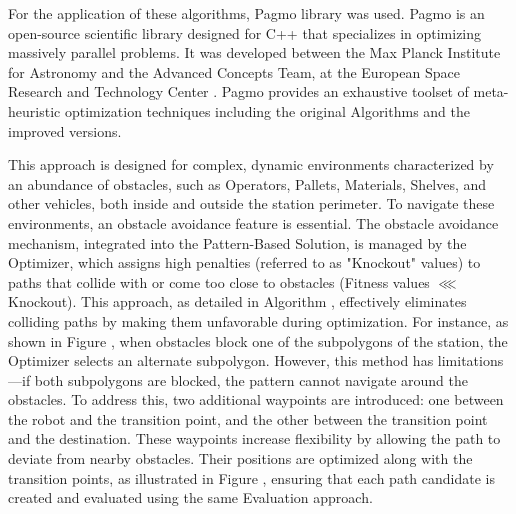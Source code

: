 For the application of these algorithms, Pagmo library was used. Pagmo is an open-source scientific library designed for 
C++ that specializes in optimizing massively parallel problems. It was developed between the Max Planck Institute for 
Astronomy and the Advanced Concepts Team, at the European Space Research and Technology Center \cite{R45}.
Pagmo provides an exhaustive toolset of meta-heuristic optimization techniques including the original Algorithms
and the improved versions. 

This approach is designed for complex, dynamic environments characterized by an abundance of obstacles, such 
as Operators, Pallets, Materials, Shelves, and other vehicles, both inside and outside the station perimeter. 
To navigate these environments, an obstacle avoidance feature is essential. The obstacle avoidance mechanism, 
integrated into the Pattern-Based Solution, is managed by the Optimizer, which assigns high penalties 
(referred to as "Knockout" values) to paths that collide with or come too close to obstacles 
(Fitness values $\lll$ Knockout). This approach, as detailed in Algorithm , 
effectively eliminates colliding paths by making them unfavorable during optimization. For instance, 
as shown in Figure , when obstacles block one of the subpolygons of the station, the 
Optimizer selects an alternate subpolygon. However, this method has limitations—if both subpolygons 
are blocked, the pattern cannot navigate around the obstacles. To address this, two additional 
waypoints are introduced: one between the robot and the transition point, and the other between 
the transition point and the destination. These waypoints increase flexibility by allowing the path 
to deviate from nearby obstacles. Their positions are optimized along with the transition points, as 
illustrated in Figure , ensuring that each path candidate is created and evaluated 
using the same Evaluation approach.


